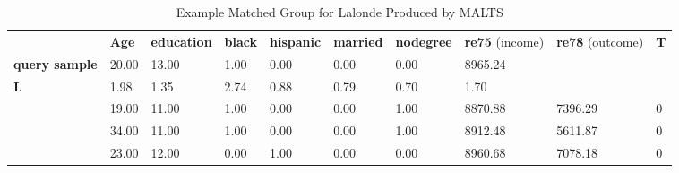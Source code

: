  \begin{table*}[h]
 \caption{Example Matched Group for Lalonde Produced by MALTS}
\begin{tabular}{llllllllll}

\cline{2-10}
\multicolumn{1}{l|}{}                   & \multicolumn{1}{l|}{\textbf{Age}} & \multicolumn{1}{l|}{\textbf{education}} & \multicolumn{1}{l|}{\textbf{black}} & \multicolumn{1}{l|}{\textbf{hispanic}} & \multicolumn{1}{l|}{\textbf{married}} & \multicolumn{1}{l|}{\textbf{nodegree}} & \multicolumn{1}{l|}{\textbf{re75} (income)} & \multicolumn{1}{l|}{\textbf{re78} (outcome)} & \multicolumn{1}{l|}{\textbf{T}} \\ \cline{2-10} 
\cline{1-8}
\multicolumn{1}{|l|}{\textbf{query sample}}    & \multicolumn{1}{l|}{20.00}        & \multicolumn{1}{l|}{13.00}              & \multicolumn{1}{l|}{1.00}           & \multicolumn{1}{l|}{0.00}              & \multicolumn{1}{l|}{0.00}             & \multicolumn{1}{l|}{0.00}              & \multicolumn{1}{l|}{8965.24}       &                                    &                                 \\ \cline{1-8}
\multicolumn{1}{|l|}{\textbf{L}}        & \multicolumn{1}{l|}{1.98}         & \multicolumn{1}{l|}{1.35}               & \multicolumn{1}{l|}{2.74}           & \multicolumn{1}{l|}{0.88}              & \multicolumn{1}{l|}{0.79}             & \multicolumn{1}{l|}{0.70}              & \multicolumn{1}{l|}{1.70}          &                                    &                                 \\ \cline{1-8}
\multicolumn{1}{l|}{}                   & \multicolumn{1}{l|}{19.00}        & \multicolumn{1}{l|}{11.00}              & \multicolumn{1}{l|}{1.00}           & \multicolumn{1}{l|}{0.00}              & \multicolumn{1}{l|}{0.00}             & \multicolumn{1}{l|}{1.00}              & \multicolumn{1}{l|}{8870.88}       & \multicolumn{1}{l|}{7396.29}       & \multicolumn{1}{l|}{0}          \\ \cline{2-10} 
\multicolumn{1}{l|}{}                   & \multicolumn{1}{l|}{34.00}        & \multicolumn{1}{l|}{11.00}              & \multicolumn{1}{l|}{1.00}           & \multicolumn{1}{l|}{0.00}              & \multicolumn{1}{l|}{0.00}             & \multicolumn{1}{l|}{1.00}              & \multicolumn{1}{l|}{8912.48}       & \multicolumn{1}{l|}{5611.87}       & \multicolumn{1}{l|}{0}          \\ \cline{2-10} 
\multicolumn{1}{l|}{}                   & \multicolumn{1}{l|}{23.00}        & \multicolumn{1}{l|}{12.00}              & \multicolumn{1}{l|}{0.00}           & \multicolumn{1}{l|}{1.00}              & \multicolumn{1}{l|}{0.00}             & \multicolumn{1}{l|}{0.00}              & \multicolumn{1}{l|}{8960.68}       & \multicolumn{1}{l|}{7078.18}       & \multicolumn{1}{l|}{0}          \\ \cline{2-10} 

\end{tabular}
\end{table*}
